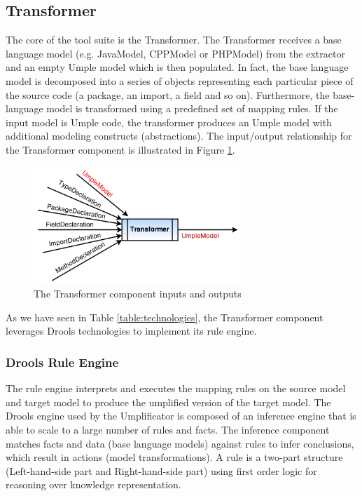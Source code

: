 \subsection{Transformer}

The core of the tool suite is the Transformer. The Transformer receives a base language model (e.g. JavaModel, CPPModel or PHPModel) from the extractor and an empty Umple model which is then populated. In fact, the base language model is decomposed into a series of objects representing each particular piece of the source code (a package, an import, a field and so on). Furthermore, the base-language model is transformed using a predefined set of mapping rules. If the input model is Umple code, the transformer produces an Umple model with additional modeling constructs (abstractions). The input/output relationship for the Transformer component is illustrated in Figure 
\ref{fig:transformerInOut}.

\begin{figure}[h]
\centering
\includegraphics[width=0.70\textwidth]{Figures/transformerINOut.png}
\caption{The Transformer component inputs and outputs}
\label{fig:transformerInOut}
\end{figure}

As we have seen in Table \ref{table:technologies}, the Transformer component leverages Drools technologies to implement its rule engine.

\subsubsection{Drools Rule Engine}

The rule engine interprets and executes the mapping rules on the source model and target model to produce the umplified version of the target model.
The Drools engine used by the Umplificator is composed of an inference engine that is able to scale to a large number of rules and facts.  The inference component matches facts and data (base language models) against rules to infer conclusions, which result in actions (model transformations). A rule is a two-part structure (Left-hand-side part and Right-hand-side part) using first order logic for reasoning over knowledge representation.

